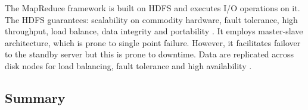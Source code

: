The MapReduce framework is built on HDFS and executes I/O operations on it. The HDFS guarantees: scalability on commodity hardware, fault tolerance, high throughput, load balance, data integrity and portability \cite{intro-hdfs}. It employs master-slave architecture, which is prone to single point failure. However, it facilitates failover to the standby server but this is prone to downtime. Data are replicated across disk nodes for load balancing, fault tolerance and high availability \cite{intro-hdfs}.

\subsection{Summary} \label{subsec-lr-tech-summ}